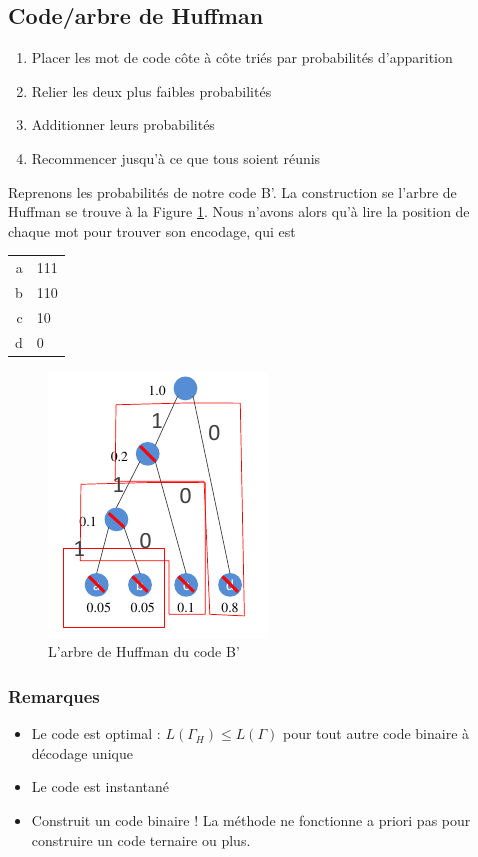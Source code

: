 \documentclass[11pt,a4paper]{article}
\begin{document}
\subsection{Code/arbre de Huffman}
\label{code huffman}
 \begin{enumerate}
	\item Placer les mot de code côte à côte triés par probabilités d'apparition
	\item Relier les deux plus faibles probabilités
	\item Additionner leurs probabilités
	\item Recommencer jusqu'à ce que tous soient réunis
\end{enumerate}
\begin{exemple}[0.85]
 	Reprenons les probabilités de notre code B'. La construction se l'arbre de Huffman se trouve à la Figure \ref{arbre huffman bprime}. Nous n'avons alors qu'à lire la position de chaque mot pour trouver son encodage, qui est
 	\begin{tabular}{r|l}
 	\hline
 	a & 111\\
 	b & 110\\
 	c & 10\\
 	d & 0\\
 	\hline
 	\end{tabular}
\end{exemple}
 \begin{figure}[!h]
 	\centering
 	\includegraphics[scale=0.6]{images/arbre_Huffman}
 	\caption{L'arbre de Huffman du code B'}
  	\label{arbre huffman bprime}
 \end{figure}
 
\subsubsection{Remarques} 
\begin{itemize}
	\item 	Le code est optimal : $L(\Gamma_H) \leq L(\Gamma)$ pour tout autre code binaire à décodage unique
	\item 	Le code est instantané
	\item 	Construit un code binaire ! La méthode ne fonctionne a priori pas pour construire un code ternaire ou plus.
\end{itemize} 
\end{document}
